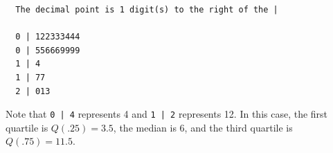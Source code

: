 \documentclass[addpoints]{examsetup}\usepackage[]{graphicx}\usepackage[]{color}
\makeatletter
\newenvironment{kframe}{%
 \def\at@end@of@kframe{}%
 \ifinner\ifhmode%
  \def\at@end@of@kframe{\end{minipage}}%
  \begin{minipage}{\columnwidth}%
 \fi\fi%
 \def\FrameCommand##1{\hskip\@totalleftmargin \hskip-\fboxsep
 \colorbox{shadecolor}{##1}\hskip-\fboxsep
     \hskip-\linewidth \hskip-\@totalleftmargin \hskip\columnwidth}%
 \MakeFramed {\advance\hsize-\width
   \@totalleftmargin\z@ \linewidth\hsize
   \@setminipage}}%
 {\par\unskip\endMakeFramed%
 \at@end@of@kframe}
\newenvironment{knitrout}{}{} %
\makeatother
\begin{document}
\begin{questions}
\begin{knitrout}
\begin{kframe}
\begin{verbatim}
  The decimal point is 1 digit(s) to the right of the |

  0 | 122333444
  0 | 556669999
  1 | 4
  1 | 77
  2 | 013
\end{verbatim}
\end{kframe}
\end{knitrout}

Note that \verb!0 | 4! represents 4 and \verb!1 | 2! represents 12. 
In this case, the first quartile is $Q(.25) = 3.5$, 
the median is 6, and the third quartile is $Q(.75) = 11.5$.

\end{questions}
\end{document}
